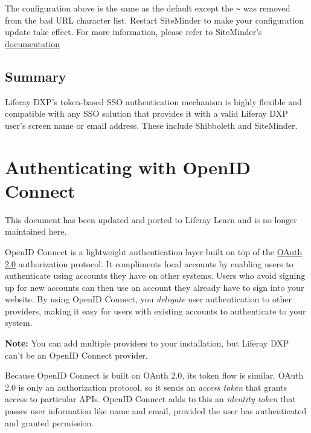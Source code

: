 The configuration above is the same as the default except the
\texttt{\textasciitilde{}} was removed from the bad URL character list.
Restart SiteMinder to make your configuration update take effect. For
more information, please refer to SiteMinder's
\href{https://support.ca.com/cadocs/0/CA\%20SiteMinder\%20r6\%200\%20SP6-ENU/Bookshelf_Files/HTML/index.htm?toc.htm?258201.html}{documentation}

\section{Summary}\label{summary-1}

Liferay DXP's token-based SSO authentication mechanism is highly
flexible and compatible with any SSO solution that provides it with a
valid Liferay DXP user's screen name or email address. These include
Shibboleth and SiteMinder.

\chapter{Authenticating with OpenID
Connect}\label{authenticating-with-openid-connect}

{This document has been updated and ported to Liferay Learn and is no
longer maintained here.}

OpenID Connect is a lightweight authentication layer built on top of the
\href{/docs/7-2/deploy/-/knowledge_base/d/oauth-2-0}{OAuth 2.0}
authorization protocol. It compliments local accounts by enabling users
to authenticate using accounts they have on other systems. Users who
avoid signing up for new accounts can then use an account they already
have to sign into your website. By using OpenID Connect, you
\emph{delegate} user authentication to other providers, making it easy
for users with existing accounts to authenticate to your system.

\noindent\hrulefill

\textbf{Note:} You can add multiple providers to your installation, but
Liferay DXP can't be an OpenID Connect provider.

\noindent\hrulefill

Because OpenID Connect is built on OAuth 2.0, its token flow is similar.
OAuth 2.0 is only an authorization protocol, so it sends an \emph{access
token} that grants access to particular APIs. OpenID Connect adds to
this an \emph{identity token} that passes user information like name and
email, provided the user has authenticated and granted permission.

